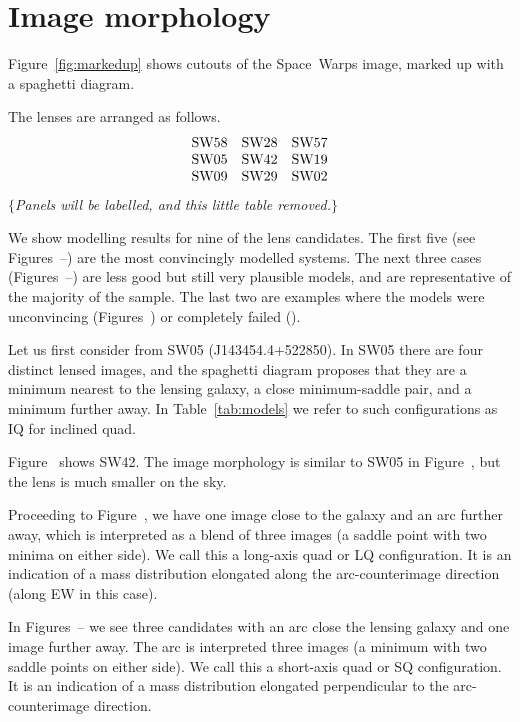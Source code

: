 \section{Image morphology}

Figure~\ref{fig:markedup} shows cutouts of the Space~Warps image,
marked up with a spaghetti diagram.

The lenses are arranged as follows.
$$
\begin{matrix}
\rm SW58 & \rm SW28 & \rm SW57 \\
\rm SW05 & \rm SW42 & \rm SW19 \\
\rm SW09 & \rm SW29 & \rm SW02
\end{matrix}
$$ 
$\{${\em Panels will be labelled, and this little table removed.}$\}$

We show modelling results for nine of the lens candidates.  The first
five (see Figures~--) are the most
convincingly modelled systems.  The next three cases
(Figures~--) are less good but still very
plausible models, and are representative of the majority of the
sample.  The last two are examples where the models were unconvincing
(Figures~) or completely failed ().


Let us first consider from SW05 (J143454.4+522850).
In SW05 there are four distinct lensed images, and the spaghetti
diagram proposes that they are a minimum nearest to the lensing
galaxy, a close minimum-saddle pair, and a minimum further away. In
Table~\ref{tab:models} we refer to such configurations as IQ for
inclined quad.

Figure~ shows SW42.  The image morphology is similar to
SW05 in Figure~, but the lens is much smaller on the sky.

Proceeding to Figure~, we have one image close to the
galaxy and an arc further away, which is interpreted as a blend of
three images (a saddle point with two minima on either side).  We call
this a long-axis quad or LQ configuration.  It is an indication of a
mass distribution elongated along the arc-counterimage direction
(along EW in this case).

In Figures~-- we see three candidates with
an arc close the lensing galaxy and one image further away.  The arc
is interpreted three images (a minimum with two saddle points on
either side).  We call this a short-axis quad or SQ configuration.  It
is an indication of a mass distribution elongated perpendicular to the
arc-counterimage direction.

